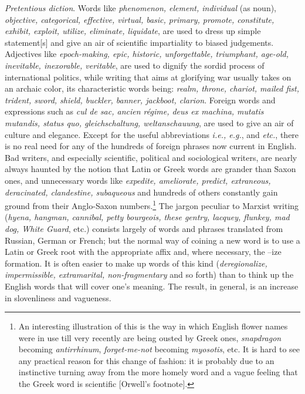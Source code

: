 \textit{Pretentious diction}. Words like \textit{phenomenon, element,
individual} (as noun), \textit{objective, categorical, effective,
virtual, basic, primary, promote, constitute, exhibit, exploit,
utilize, eliminate, liquidate}, are used to dress up simple
statement[s] and give an air of scientific impartiality to biased
judgements. Adjectives like \textit{epoch-making, epic, historic,
unforgettable, triumphant, age-old, inevitable, inexorable,
veritable}, are used to dignify the sordid process of international
politics, while writing that aims at glorifying war usually takes on
an archaic color, its characteristic words being: \textit{realm,
throne, chariot, mailed fist, trident, sword, shield, buckler, banner,
jackboot, clarion}. Foreign words and expressions such as \textit{cul
de sac, ancien r\'{e}gime, deus ex machina, mutatis mutandis, status
quo, gleichschaltung, weltanschauung}, are used to give an air of
culture and elegance. Except for the useful abbreviations
\textit{i.e., e.g.}, and \textit{etc.}, there is no real need for any
of the hundreds of foreign phrases now current in English. Bad
writers, and especially scientific, political and sociological
writers, are nearly always haunted by the notion that Latin or Greek
words are grander than Saxon ones, and unnecessary words like
\textit{expedite, ameliorate, predict, extraneous, deracinated,
clandestine, subaqueous} and hundreds  of others constantly
gain ground from their Anglo-Saxon numbers.\footnote{An interesting
illustration of this is the way in which English flower names were in
use till very recently are being ousted by Greek ones,
\textit{snapdragon} becoming \textit{antirrhinum},
\textit{forget-me-not} becoming \textit{myosotis}, etc. It is hard to
see any practical reason for this change of fashion: it is probably
due to an instinctive turning away from the more homely word and a
vague feeling that the Greek word is scientific [Orwell's footnote].}
The jargon peculiar to Marxist writing (\textit{hyena, hangman,
cannibal, petty bourgeois, these gentry, lacquey, flunkey, mad dog,
White Guard}, etc.) consists largely of words and phrases translated
from Russian, German or French; but the normal way of coining a new
word is to use a Latin or Greek root with the appropriate affix and,
where necessary, the --ize formation. It is often easier to make up
words of this kind (\textit{deregionalize, impermissible,
extramarital, non-fragmentary} and so forth) than to think up the
English words that will cover one's meaning. The result, in general,
is an increase in slovenliness and vagueness.

